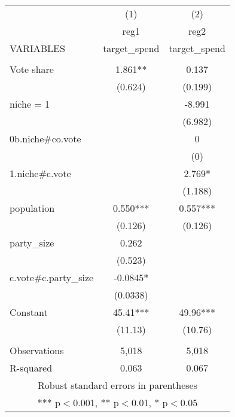 \documentclass[]{article}
\begin{document}
\begin{tabular}{lcc} \hline
 & (1) & (2) \\
 & reg1 & reg2 \\
VARIABLES & target\_spend & target\_spend \\ \hline
 &  &  \\
Vote share & 1.861** & 0.137 \\
 & (0.624) & (0.199) \\
niche = 1 &  & -8.991 \\
 &  & (6.982) \\
0b.niche\#co.vote &  & 0 \\
 &  & (0) \\
1.niche\#c.vote &  & 2.769* \\
 &  & (1.188) \\
population & 0.550*** & 0.557*** \\
 & (0.126) & (0.126) \\
party\_size & 0.262 &  \\
 & (0.523) &  \\
c.vote\#c.party\_size & -0.0845* &  \\
 & (0.0338) &  \\
Constant & 45.41*** & 49.96*** \\
 & (11.13) & (10.76) \\
 &  &  \\
Observations & 5,018 & 5,018 \\
 R-squared & 0.063 & 0.067 \\ \hline
\multicolumn{3}{c}{ Robust standard errors in parentheses} \\
\multicolumn{3}{c}{ *** p$<$0.001, ** p$<$0.01, * p$<$0.05} \\
\end{tabular}
\end{document}
